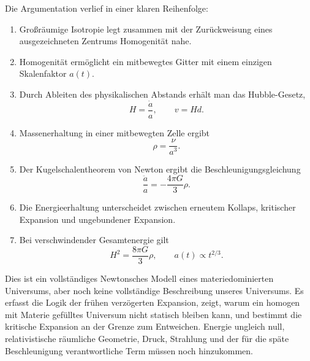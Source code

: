 Die Argumentation verlief in einer klaren Reihenfolge:
\begin{enumerate}
\item Großräumige Isotropie legt zusammen mit der Zurückweisung eines ausgezeichneten Zentrums Homogenität nahe.
\item Homogenität ermöglicht ein mitbewegtes Gitter mit einem einzigen Skalenfaktor \(a(t)\).
\item Durch Ableiten des physikalischen Abstands erhält man das Hubble-Gesetz,
  \[
  H=\frac{\dot a}{a},
  \qquad
  v=Hd.
  \]
\item Massenerhaltung in einer mitbewegten Zelle ergibt
  \[
  \rho=\frac{\nu}{a^3}.
  \]
\item Der Kugelschalentheorem von Newton ergibt die Beschleunigungsgleichung
  \[
  \frac{\ddot a}{a}=-\frac{4\pi G}{3}\rho.
  \]
\item Die Energieerhaltung unterscheidet zwischen erneutem Kollaps, kritischer Expansion und ungebundener Expansion.
\item Bei verschwindender Gesamtenergie gilt
  \[
  H^2=\frac{8\pi G}{3}\rho,
  \qquad
  a(t)\propto t^{2/3}.
  \]
\end{enumerate}

Dies ist ein vollständiges Newtonsches Modell eines materiedominierten Universums, aber noch keine vollständige Beschreibung unseres Universums. Es erfasst die Logik der frühen verzögerten Expansion, zeigt, warum ein homogen mit Materie gefülltes Universum nicht statisch bleiben kann, und bestimmt die kritische Expansion an der Grenze zum Entweichen. Energie ungleich null, relativistische räumliche Geometrie, Druck, Strahlung und der für die späte Beschleunigung verantwortliche Term müssen noch hinzukommen.